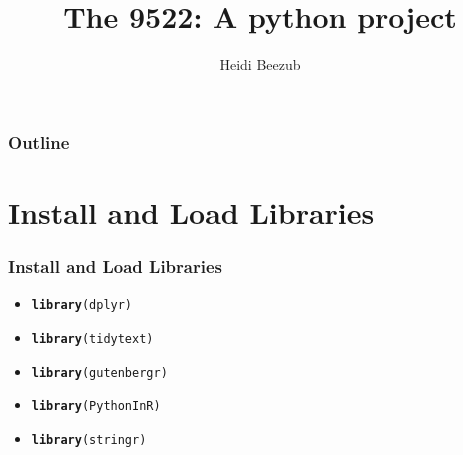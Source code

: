 \documentclass{beamer}\usepackage[]{graphicx}\usepackage[]{color}
\makeatletter
\newcommand{\hlstd}[1]{\textcolor[rgb]{0.345,0.345,0.345}{#1}}%
\newcommand{\hlkwd}[1]{\textcolor[rgb]{0.737,0.353,0.396}{\textbf{#1}}}%
\newenvironment{kframe}{%
 \def\at@end@of@kframe{}%
 \ifinner\ifhmode%
  \def\at@end@of@kframe{\end{minipage}}%
  \begin{minipage}{\columnwidth}%
 \fi\fi%
 \def\FrameCommand##1{\hskip\@totalleftmargin \hskip-\fboxsep
 \colorbox{shadecolor}{##1}\hskip-\fboxsep
     \hskip-\linewidth \hskip-\@totalleftmargin \hskip\columnwidth}%
 \MakeFramed {\advance\hsize-\width
   \@totalleftmargin\z@ \linewidth\hsize
   \@setminipage}}%
 {\par\unskip\endMakeFramed%
 \at@end@of@kframe}
\newenvironment{knitrout}{}{} %
\makeatother
\begin{document}
\title{The 9522: A python project}
\author{Heidi Beezub}

\begin{frame}
  \titlepage
\end{frame}

\begin{frame}
  \frametitle{Outline}
    \tableofcontents
\end{frame}

\section{Install and Load Libraries}
\begin{frame}[fragile]
  \frametitle{Install and Load Libraries}
    \begin{itemize}
      \item<1->
\begin{knitrout}
\color{fgcolor}\begin{kframe}
\begin{alltt}
\hlkwd{library}\hlstd{(dplyr)}
\end{alltt}
\end{kframe}
\end{knitrout}
      \item<2->
\begin{knitrout}
\color{fgcolor}\begin{kframe}
\begin{alltt}
\hlkwd{library}\hlstd{(tidytext)}
\end{alltt}
\end{kframe}
\end{knitrout}
    \item<3->
\begin{knitrout}
\color{fgcolor}\begin{kframe}
\begin{alltt}
\hlkwd{library}\hlstd{(gutenbergr)}
\end{alltt}
\end{kframe}
\end{knitrout}
    \item<4->
\begin{knitrout}
\color{fgcolor}\begin{kframe}
\begin{alltt}
\hlkwd{library}\hlstd{(PythonInR)}
\end{alltt}
\end{kframe}
\end{knitrout}
    \item<5->
\begin{knitrout}
\color{fgcolor}\begin{kframe}
\begin{alltt}
\hlkwd{library}\hlstd{(stringr)}
\end{alltt}
\end{kframe}
\end{knitrout}
    

\end{itemize}
\end{frame}
\end{document}
